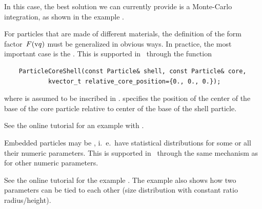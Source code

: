%
%
%
%
%
%

In this case, the best solution we can currently provide
  is a Monte-Carlo integration, as shown in the example
  .

For particles that are made of different materials,
the definition %
of the form factor~$F(\text{v}{q})$
must be generalized in obvious ways.
In practice, the most important case is the .
%
%
%
This is supported in \BornAgain\ through the function
\setCpp
\begin{lstlisting}
    ParticleCoreShell(const Particle& shell, const Particle& core,
            kvector_t relative_core_position={0., 0., 0.});
\end{lstlisting}
where  is assumed to be inscribed
in .
specifies the position of the
center of the base of the core particle relative
to center of the base of the shell particle.

See the online tutorial for an example with .

%
%
%
%
Embedded particles may be , i.~e.\ have statistical distributions
for some or all their numeric parameters.
This is supported in \BornAgain\ through the same mechanism
as for other numeric parameters.

See the online tutorial for the example .
  The example also shows how two parameters can be tied to each other
(size distribution with constant ratio radius/height).

